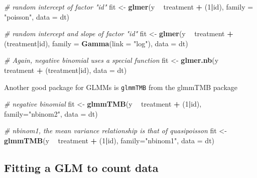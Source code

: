 \documentclass[]{book}
\newenvironment{Shaded}{\begin{snugshade}}{\end{snugshade}}
\newcommand{\CommentTok}[1]{\textcolor[rgb]{0.56,0.35,0.01}{\textit{#1}}}
\newcommand{\DataTypeTok}[1]{\textcolor[rgb]{0.13,0.29,0.53}{#1}}
\newcommand{\DecValTok}[1]{\textcolor[rgb]{0.00,0.00,0.81}{#1}}
\newcommand{\KeywordTok}[1]{\textcolor[rgb]{0.13,0.29,0.53}{\textbf{#1}}}
\newcommand{\NormalTok}[1]{#1}
\newcommand{\OperatorTok}[1]{\textcolor[rgb]{0.81,0.36,0.00}{\textbf{#1}}}
\newcommand{\StringTok}[1]{\textcolor[rgb]{0.31,0.60,0.02}{#1}}
\begin{document}
\begin{Shaded}
\begin{Highlighting}[]
\CommentTok{# random intercept of factor "id"}
\NormalTok{fit <-}\StringTok{ }\KeywordTok{glmer}\NormalTok{(y }\OperatorTok{~}\StringTok{ }\NormalTok{treatment }\OperatorTok{+}\StringTok{ }\NormalTok{(}\DecValTok{1}\OperatorTok{|}\NormalTok{id), }\DataTypeTok{family =} \StringTok{"poisson"}\NormalTok{, }\DataTypeTok{data =}\NormalTok{ dt)}

\CommentTok{# random intercept and slope of factor "id"}
\NormalTok{fit <-}\StringTok{ }\KeywordTok{glmer}\NormalTok{(y }\OperatorTok{~}\StringTok{ }\NormalTok{treatment }\OperatorTok{+}\StringTok{ }\NormalTok{(treatment}\OperatorTok{|}\NormalTok{id), }\DataTypeTok{family =} \KeywordTok{Gamma}\NormalTok{(}\DataTypeTok{link =} \StringTok{"log"}\NormalTok{), }\DataTypeTok{data =}\NormalTok{ dt)}

\CommentTok{# Again, negative binomial uses a special function}
\NormalTok{fit <-}\StringTok{ }\KeywordTok{glmer.nb}\NormalTok{(y }\OperatorTok{~}\StringTok{ }\NormalTok{treatment }\OperatorTok{+}\StringTok{ }\NormalTok{(treatment}\OperatorTok{|}\NormalTok{id), }\DataTypeTok{data =}\NormalTok{ dt)}
\end{Highlighting}
\end{Shaded}

Another good package for GLMMs is \texttt{glmmTMB} from the glmmTMB package

\begin{Shaded}
\begin{Highlighting}[]
\CommentTok{# negative binomial}
\NormalTok{fit <-}\StringTok{ }\KeywordTok{glmmTMB}\NormalTok{(y }\OperatorTok{~}\StringTok{ }\NormalTok{treatment }\OperatorTok{+}\StringTok{ }\NormalTok{(}\DecValTok{1}\OperatorTok{|}\NormalTok{id), }\DataTypeTok{family=}\StringTok{"nbinom2"}\NormalTok{, }\DataTypeTok{data =}\NormalTok{ dt)}

\CommentTok{# nbinom1, the mean variance relationship is that of quasipoisson}
\NormalTok{fit <-}\StringTok{ }\KeywordTok{glmmTMB}\NormalTok{(y }\OperatorTok{~}\StringTok{ }\NormalTok{treatment }\OperatorTok{+}\StringTok{ }\NormalTok{(}\DecValTok{1}\OperatorTok{|}\NormalTok{id), }\DataTypeTok{family=}\StringTok{"nbinom1"}\NormalTok{, }\DataTypeTok{data =}\NormalTok{ dt)}
\end{Highlighting}
\end{Shaded}

\hypertarget{fitting-a-glm-to-count-data}{%
\subsection{Fitting a GLM to count data}\label{fitting-a-glm-to-count-data}}
\end{document}
